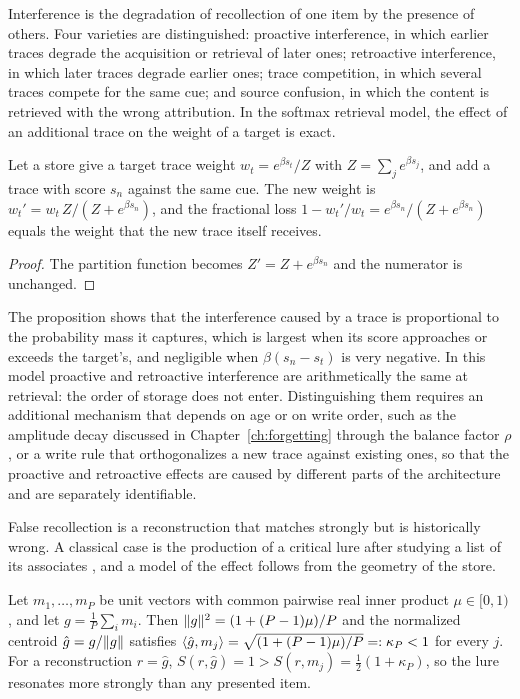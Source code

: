Interference is the degradation of recollection of one item by the presence of others. Four varieties are distinguished: proactive interference, in which earlier traces degrade the acquisition or retrieval of later ones; retroactive interference, in which later traces degrade earlier ones; trace competition, in which several traces compete for the same cue; and source confusion, in which the content is retrieved with the wrong attribution. In the softmax retrieval model, the effect of an additional trace on the weight of a target is exact.

\begin{proposition}\label{prop:dilution}
Let a store give a target trace weight $w_t=e^{\beta s_t}/Z$ with $Z=\sum_je^{\beta s_j}$, and add a trace with score $s_n$ against the same cue. The new weight is $w_t'=w_t\,Z/(Z+e^{\beta s_n})$, and the fractional loss $1-w_t'/w_t=e^{\beta s_n}/(Z+e^{\beta s_n})$ equals the weight that the new trace itself receives.
\end{proposition}

\begin{proof}
The partition function becomes $Z'=Z+e^{\beta s_n}$ and the numerator is unchanged.
\end{proof}

The proposition shows that the interference caused by a trace is proportional to the probability mass it captures, which is largest when its score approaches or exceeds the target's, and negligible when $\beta(s_n-s_t)$ is very negative. In this model proactive and retroactive interference are arithmetically the same at retrieval: the order of storage does not enter. Distinguishing them requires an additional mechanism that depends on age or on write order, such as the amplitude decay discussed in Chapter~\ref{ch:forgetting} through the balance factor $\rho$, or a write rule that orthogonalizes a new trace against existing ones, so that the proactive and retroactive effects are caused by different parts of the architecture and are separately identifiable.

False recollection is a reconstruction that matches strongly but is historically wrong. A classical case is the production of a critical lure after studying a list of its associates \cite{roediger1995}, and a model of the effect follows from the geometry of the store.

\begin{proposition}\label{prop:lure}
Let $m_1,\dots,m_P$ be unit vectors with common pairwise real inner product $\mu\in[0,1)$, and let $g=\frac1P\sum_im_i$. Then $\lVert g\rVert^2=(1+(P-1)\mu)/P$ and the normalized centroid $\hat g=g/\lVert g\rVert$ satisfies $\langle \hat g,m_j\rangle=\sqrt{(1+(P-1)\mu)/P}=:\kappa_P<1$ for every $j$. For a reconstruction $r=\hat g$, $S(r,\hat g)=1>S(r,m_j)=\tfrac12(1+\kappa_P)$, so the lure resonates more strongly than any presented item.
\end{proposition}

